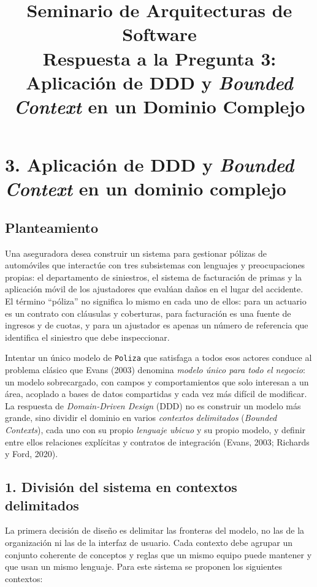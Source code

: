 \documentclass[11pt,a4paper]{article}
\title{\textbf{Seminario de Arquitecturas de Software}\\[2pt]
\large Respuesta a la Pregunta 3:\\
Aplicación de DDD y \emph{Bounded Context} en un Dominio Complejo}
\author{}
\date{}
\begin{document}
\maketitle

\section*{3. Aplicación de DDD y \emph{Bounded Context} en un dominio complejo}

\subsection*{Planteamiento}

Una aseguradora desea construir un sistema para gestionar pólizas de automóviles que
interactúe con tres subsistemas con lenguajes y preocupaciones propias: el departamento
de siniestros, el sistema de facturación de primas y la aplicación móvil de los ajustadores
que evalúan daños en el lugar del accidente. El término ``póliza'' no significa lo mismo en
cada uno de ellos: para un actuario es un contrato con cláusulas y coberturas, para
facturación es una fuente de ingresos y de cuotas, y para un ajustador es apenas un número
de referencia que identifica el siniestro que debe inspeccionar.

Intentar un único modelo de \texttt{Poliza} que satisfaga a todos esos actores conduce al
problema clásico que Evans (2003) denomina \emph{modelo único para todo el negocio}: un
modelo sobrecargado, con campos y comportamientos que solo interesan a un área, acoplado a
bases de datos compartidas y cada vez más difícil de modificar. La respuesta de
\emph{Domain-Driven Design} (DDD) no es construir un modelo más grande, sino dividir el
dominio en varios \emph{contextos delimitados} (\emph{Bounded Contexts}), cada uno con su
propio \emph{lenguaje ubicuo} y su propio modelo, y definir entre ellos relaciones
explícitas y contratos de integración (Evans, 2003; Richards y Ford, 2020).

\subsection*{1. División del sistema en contextos delimitados}

La primera decisión de diseño es delimitar las fronteras del modelo, no las de la
organización ni las de la interfaz de usuario. Cada contexto debe agrupar un conjunto
coherente de conceptos y reglas que un mismo equipo puede mantener y que usan un mismo
lenguaje. Para este sistema se proponen los siguientes contextos:
\end{document}
